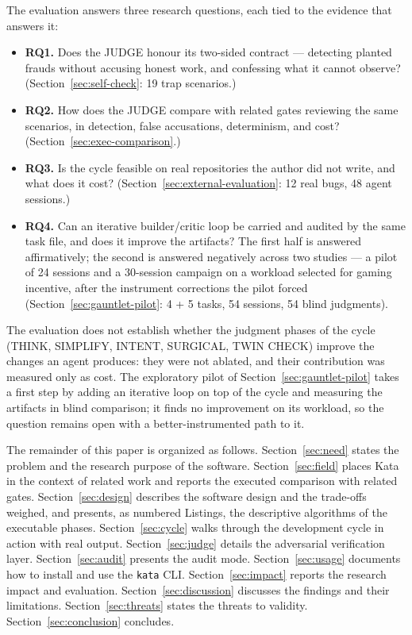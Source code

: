 \documentclass[11pt]{article}
\begin{document}
The evaluation answers three research questions, each tied to the evidence
that answers it:
\begin{itemize}
\item \textbf{RQ1.} Does the JUDGE honour its two-sided contract ---
detecting planted frauds without accusing honest work, and confessing what
it cannot observe? (Section~\ref{sec:self-check}: 19 trap scenarios.)
\item \textbf{RQ2.} How does the JUDGE compare with related gates reviewing
the same scenarios, in detection, false accusations, determinism, and cost?
(Section~\ref{sec:exec-comparison}.)
\item \textbf{RQ3.} Is the cycle feasible on real repositories the author did
not write, and what does it cost? (Section~\ref{sec:external-evaluation}: 12
real bugs, 48 agent sessions.)
\item \textbf{RQ4.} Can an iterative builder/critic loop be carried and audited
by the same task file, and does it improve the artifacts? The first half is
answered affirmatively; the second is answered negatively across two studies ---
a pilot of 24 sessions and a 30-session campaign on a workload selected for
gaming incentive, after the instrument corrections the pilot forced
(Section~\ref{sec:gauntlet-pilot}: 4 + 5 tasks, 54 sessions, 54 blind
judgments).
\end{itemize}
The evaluation does not establish whether the judgment phases of the cycle
(THINK, SIMPLIFY, INTENT, SURGICAL, TWIN CHECK) improve the changes an agent
produces: they were not ablated, and their contribution was measured only as
cost. The exploratory pilot of Section~\ref{sec:gauntlet-pilot} takes a first
step by adding an iterative loop on top of the cycle and measuring the
artifacts in blind comparison; it finds no improvement on its workload, so the
question remains open with a better-instrumented path to it.

The remainder of this paper is organized as follows. Section~\ref{sec:need}
states the problem and the research purpose of the software.
Section~\ref{sec:field} places Kata in the context of related work and
reports the executed comparison with related gates.
Section~\ref{sec:design} describes the software design and the trade-offs
weighed, and presents, as numbered Listings, the descriptive algorithms of
the executable phases. Section~\ref{sec:cycle} walks through the development
cycle in action with real output. Section~\ref{sec:judge} details the adversarial
verification layer. Section~\ref{sec:audit} presents the audit mode.
Section~\ref{sec:usage} documents how to install and use the \texttt{kata}
CLI. Section~\ref{sec:impact} reports the research impact and evaluation.
Section~\ref{sec:discussion} discusses the findings and their limitations.
Section~\ref{sec:threats} states the threats to validity.
Section~\ref{sec:conclusion} concludes.
\end{document}
